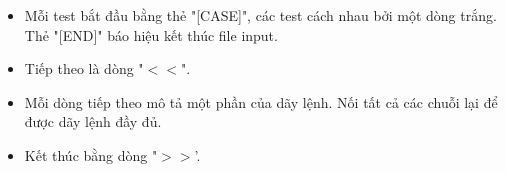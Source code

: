 \begin{itemize}
	\item     Mỗi test bắt đầu bằng thẻ "[CASE]", các test cách nhau bởi một dòng trắng. Thẻ "[END]" báo hiệu kết thúc file input.   
	\item     Tiếp theo là dòng "$<$$<$".   
	\item     Mỗi dòng tiếp theo mô tả một phần của dãy lệnh. Nối tất cả các chuỗi lại để được dãy lệnh đầy đủ.   
	\item     Kết thúc bằng dòng "$>$$>$'.   
\end{itemize}